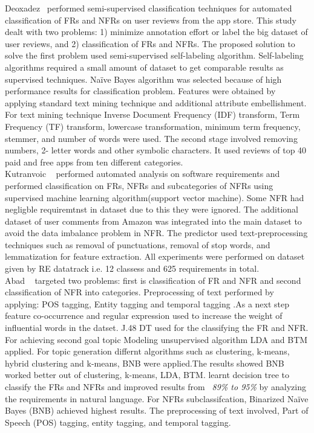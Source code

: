	Deoxadez \etal~\cite{Deocadez:2017}performed semi-supervised classification techniques
for automated classification of FRs and NFRs on user reviews from the app store.
This study dealt with two problems: 1) minimize annotation effort or label the
big dataset of user reviews, and 2) classification of FRs and NFRs. The proposed
solution to solve the first problem used semi-supervised self-labeling
algorithm. Self-labeling algorithms required a small amount of dataset to get
comparable results as supervised techniques. Naïve Bayes algorithm was selected
because of high performance results for classification problem. Features were
obtained by applying standard text mining technique and additional attribute
embellishment. For text mining technique Inverse Document Frequency (IDF) transform, Term Frequency (TF) transform, lowercase
transformation, minimum term frequency, stemmer, and number of words were used. The second stage involved removing numbers, 2- letter words
and other symbolic characters. It used reviews of top 40 paid and free apps from ten different categories.\\

	Kutranvoic \etal ~ \cite {Kurtanovic:2017}performed automated analysis on
software requirements and performed classification on FRs, NFRs and
subcategories of NFRs using supervised machine learning algorithm(support vector
machine). Some NFR had negligble requiremtnst in dataset due to this they were
ignored. The additional dataset of user comments from Amazon was integrated into
the main dataset to avoid the data imbalance problem in NFR. The predictor used
text-preprocessing techniques such as removal of punctuations, removal of stop
words, and lemmatization for feature extraction. All experiments were performed
on dataset given by RE datatrack i.e. 12 classess and 625 requirements in total.\\

 	Abad \etal ~ \cite{Abad:2017} targeted two problems: first is classification of
 FR and NFR and second classification of NFR into categories. Preprocessing of
 text performed by applying: POS tagging, Entity tagging and temporal tagging
 .As a next step feature co-occurrence and regular expression used to increase
 the weight of influential words in the datset. 
J.48 DT used for the classifying the FR and NFR. For achieving second goal topic Modeling unsupervised algorithm
 LDA and BTM applied. For topic generation differnt algorithms such as
 clustering, k-means, hybrid clustering and k-means, BNB were applied.The
 results showed BNB worked better out of clustering, k-means, LDA, BTM.
learnt decision tree to classify the FRs and NFRs and improved results from 
\emph{~89\% to 95\%} by analyzing the requirements in natural language. For NFRs
subclassifcation, Binarized Naïve Bayes (BNB) achieved highest results. The
preprocessing of text involved, Part of Speech (POS) tagging, entity tagging,
and temporal tagging.\\

